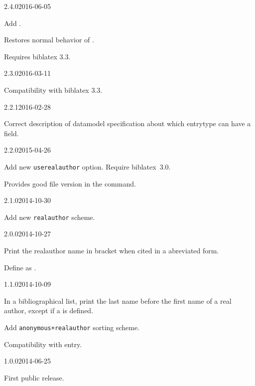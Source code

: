 \documentclass{ltxdockit}[2011/03/25]
\newcommand{\biblatex}{biblatex\xspace}
\begin{document}
\begin{changelog}

  \begin{release}{2.4.0}{2016-06-05}
    \item Add .
    \item Restores normal behavior of .
    \item Requires biblatex 3.3.
  \end{release}

  \begin{release}{2.3.0}{2016-03-11}
  \item Compatibility with biblatex 3.3.
  \end{release}

  \begin{release}{2.2.1}{2016-02-28}
  \item Correct description of datamodel specification about which entrytype can have a  field.
  \end{release}


  \begin{release}{2.2.0}{2015-04-26}
  \item Add new \verb|userealauthor| option. Require \biblatex~3.0. 
  \item Provides good file version in the  command.
  \end{release}

  \begin{release}{2.1.0}{2014-10-30}
  \item Add new \verb|realauthor| scheme. 
  \end{release}


  \begin{release}{2.0.0}{2014-10-27}
  \item Print the realauthor name in bracket when cited in a abreviated form.
  \item Define  as . 
  \end{release}

\begin{release}{1.1.0}{2014-10-09}
\item In a bibliographical list, print the last name before the first name of a real author, except if a  is defined.
\item Add \verb|anonymous+realauthor| sorting scheme.   
\item Compatibility with  entry. 
\end{release}

\begin{release}{1.0.0}{2014-06-25}
\item First public release.
\end{release}
\end{changelog}
\end{document}
